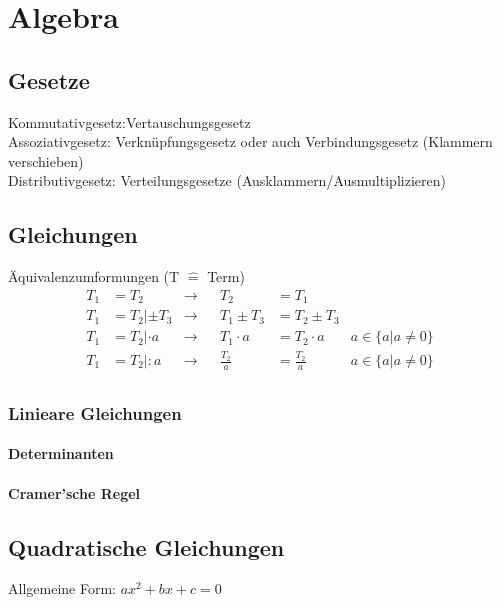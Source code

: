 \section{Algebra}
\subsection{Gesetze}
Kommutativgesetz:Vertauschungsgesetz \\
Assoziativgesetz: Verknüpfungsgesetz oder auch Verbindungsgesetz (Klammern verschieben) \\
Distributivgesetz: Verteilungsgesetze (Ausklammern/Ausmultiplizieren)







\subsection{Gleichungen}
Äquivalenzumformungen (T $\widehat{=}$ Term)
\begin{align*}
T_1 &= T_2 &\longrightarrow& & T_2 &= T_1 \\
T_1 &= T_2 | \pm T_3 &\longrightarrow& & T_1 \pm T_3 &= T_2 \pm T_3 \\
T_1 &= T_2 | \cdot a &\longrightarrow& & T_1 \cdot a &= T_2 \cdot a &a \in \{a|a \neq 0\} \\
T_1 &= T_2 | : a &\longrightarrow& & \frac{T_2}{a} &= \frac{T_2}{a} &a \in \{a|a \neq 0\} \\
\end{align*}


\subsubsection{Linieare Gleichungen}
\paragraph{Determinanten}
\paragraph{Cramer'sche Regel}

\subsection{Quadratische Gleichungen}
Allgemeine Form:
$ ax^2 + bx + c = 0 $

